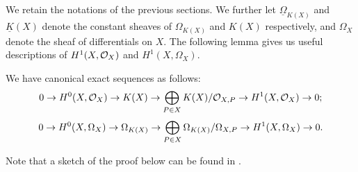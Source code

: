 We retain the notations of the previous sections.
We further let $\underline{\Omega}_{K(X)}$ and $\underline{K}(X)$ denote the constant sheaves of $\Omega_{K(X)}$ and $K(X)$ respectively, and $\Omega_X$ denote the sheaf of differentials on $X$.
The following lemma gives us useful descriptions of $H^1(X,\mathcal{O}_X)$ and $H^1(X,\Omega_X)$.
    \begin{lem}\label{lemmaexactsequenceofhoneandhzero}
    We have canonical exact sequences as follows:
        \begin{equation}\label{equationinitialdualitylesfunctions}
        0 \rightarrow H^0(X,{\cal O}_X) \rightarrow K(X) \rightarrow \bigoplus_{P \in X} K(X)/{\cal O}_{X,P} \rightarrow H^1(X,\mathcal{O}_X) \rightarrow  0;
        \end{equation}
        \begin{equation}\label{equationinitialdualitysesdifferentials}
        0 \rightarrow {H^0(X,\Omega_X)} \rightarrow \Omega_{K(X)} \rightarrow \bigoplus_{P \in X}\Omega_{K(X)}/\Omega_{X,P} \rightarrow H^1(X,\Omega_X) \rightarrow 0.
        \end{equation}
    \end{lem}
    \begin{rem}
    Note that a sketch of the proof below can be found in \cite[Pg.\ 248]{hart}.
        \end{rem}
